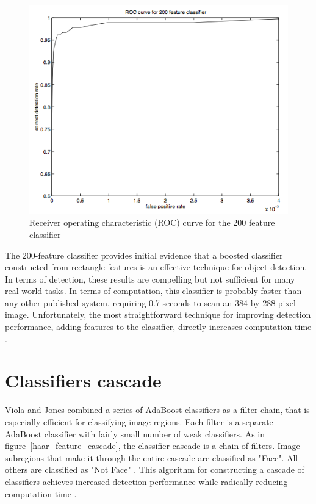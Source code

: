 \begin{figure}[!h]
\begin{center}
\noindent \includegraphics[scale=0.8]{figures/haar_feature_example_result} 
\newline
\caption{Receiver operating characteristic (ROC) curve for the 200 feature classifier}
\label{haar_feature_example_result}
\end{center} 
\end{figure}

\noindent The 200-feature classifier provides initial evidence that a boosted classifier constructed from rectangle features is an effective technique for object detection. In terms of detection, these results are compelling but not sufficient for many real-world tasks. In terms of computation, this classifier is probably faster than any other published system, requiring 0.7 seconds to scan an 384 by 288 pixel image. Unfortunately, the most straightforward technique for improving detection performance, adding features to the classifier, directly increases computation time \cite{VIO01}.
\newline

\section{Classifiers cascade}

\vspace{\baselineskip}
\noindent Viola and Jones combined a series of AdaBoost classifiers as a filter chain, that is especially efficient for classifying image regions. Each filter is a separate AdaBoost classifier with fairly small number of weak classifiers. As in figure~\ref{haar_feature_cascade}, the classifier cascade is a chain of filters. Image subregions that make it through the entire cascade are classified as "Face". All others are classified as "Not Face" \cite{HEW07}. This algorithm for constructing a cascade of classifiers achieves increased detection performance while radically reducing computation time \cite{VIO01}.
\newline

